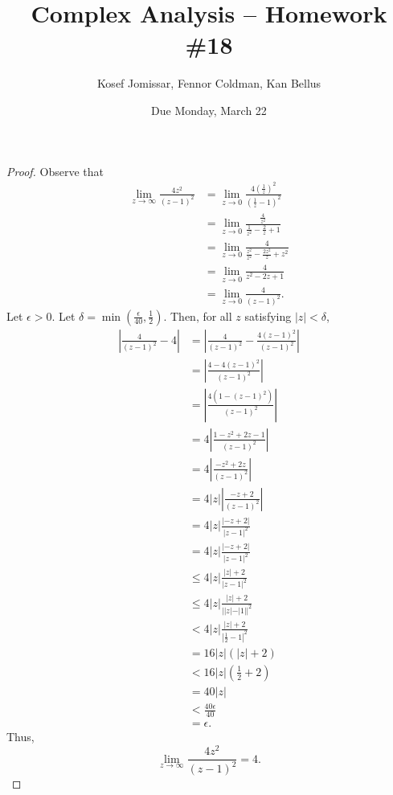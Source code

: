 \documentclass[11pt]{article}		%
\title{Complex Analysis -- Homework \#18}
\author{Kosef Jomissar, Fennor Coldman, Kan Bellus}
\date{Due Monday, March 22}
\theoremstyle{definition}
\begin{document}
\color{white}
\pagecolor{black}
\maketitle

\begin{proof}
    Observe that
    \begin{align*}
        \lim_{z\to \infty}\frac{4z^2}{(z-1)^2} &= \lim_{z\to 0}\frac{4\left(\frac1z\right)^2}{\left(\frac1z-1\right)^2} \\
        &= \lim_{z\to 0}\frac{\frac4{z^2}}{\frac1{z^2}-\frac2z + 1} \\
        &= \lim_{z\to 0}\frac{4}{\frac{z^2}{z^2}-\frac{2z^2}z + z^2} \\
        &= \lim_{z\to 0}\frac{4}{z^2 - 2z + 1} \\
        &= \lim_{z\to 0}\frac{4}{(z-1)^2}.
    \end{align*}
    Let $\epsilon > 0$.
    Let $\delta = \min\left(\frac{\epsilon}{40}, \frac12\right)$.
    Then, for all $z$ satisfying $|z| < \delta$,
    \begin{align*}
        \left| \frac{4}{(z-1)^2} - 4 \right| &= \left| \frac{4}{(z-1)^2} -\frac{4(z-1)^2}{(z-1)^2} \right| \\
        &= \left| \frac{4 - 4(z-1)^2}{(z-1)^2} \right| \\
        &= \left| \frac{4\left(1 - (z-1)^2\right)}{(z-1)^2} \right| \\
        &= 4\left| \frac{1 - z^2 + 2z - 1}{(z-1)^2} \right| \\
        &= 4\left| \frac{-z^2 + 2z}{(z-1)^2} \right| \\
        &= 4|z|\left| \frac{-z + 2}{(z-1)^2} \right| \\
        &= 4|z| \frac{|-z + 2|}{|z-1|^2} \\
        &= 4|z| \frac{|-z + 2|}{|z-1|^2} \\
        &\leq 4|z| \frac{|z| + 2}{|z-1|^2} \\
        &\leq 4|z| \frac{|z| + 2}{||z|-|1||^2} \\
        &< 4|z| \frac{|z| + 2}{\left|\frac12-1\right|^2} \\
        &= 16|z|(|z| + 2) \\
        &< 16|z|\left(\frac12 + 2\right) \\
        &= 40|z| \\
        &< \frac{40\epsilon}{40} \\
        &= \epsilon.
    \end{align*}
    Thus, $$\lim_{z\to \infty}\frac{4z^2}{(z-1)^2} = 4.$$
\end{proof}
\end{document}
